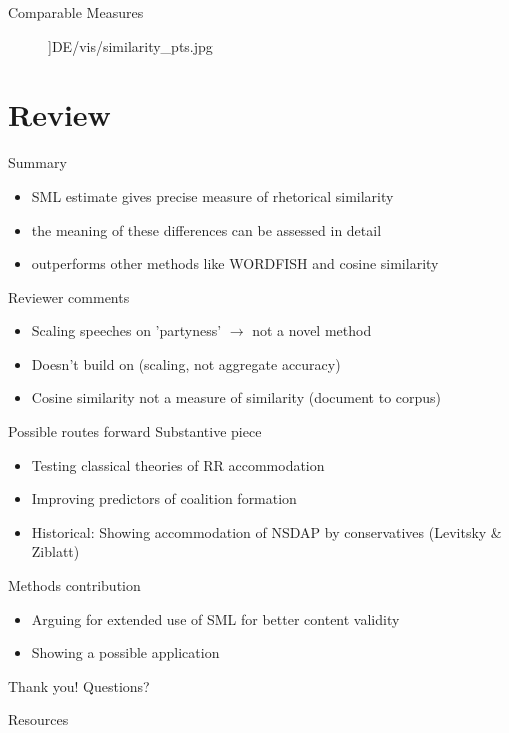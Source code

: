 \documentclass{beamer}
\begin{document}
\begin{frame}{Comparable Measures}
\begin{figure}
\textwidth]{DE/vis/similarity_pts.jpg}
\end{figure}
\end{frame}


\section{Review}
\begin{frame}{Summary}
\begin{itemize}
    \item SML estimate gives precise measure of rhetorical similarity
    \item the meaning of these differences can be assessed in detail
    \item outperforms other methods like WORDFISH and cosine similarity
\end{itemize}
\end{frame}

\begin{frame}{Reviewer comments}
    \begin{itemize}
        \item Scaling speeches on 'partyness' $\rightarrow$ not a novel method
        \item Doesn't build on \cite{Peterson2018} (scaling, not aggregate accuracy)
        \item Cosine similarity not a measure of similarity (document to corpus)
    \end{itemize}
\end{frame}

\begin{frame}{Possible routes forward}
    Substantive piece
    \begin{itemize}
        \item Testing classical theories of RR accommodation
        \item Improving predictors of coalition formation
        \item Historical: Showing accommodation of NSDAP by conservatives (Levitsky \& Ziblatt)
    \end{itemize}
    
    Methods contribution
    \begin{itemize}
        \item Arguing for extended use of SML for better content validity
        \item Showing a possible application
    \end{itemize}
\end{frame}

\begin{frame}{Thank you!}
    \huge \centering
    Questions?
\end{frame}



\begin{frame}[allowframebreaks]{Resources}
     \printbibliography
\end{frame}
\end{document}
